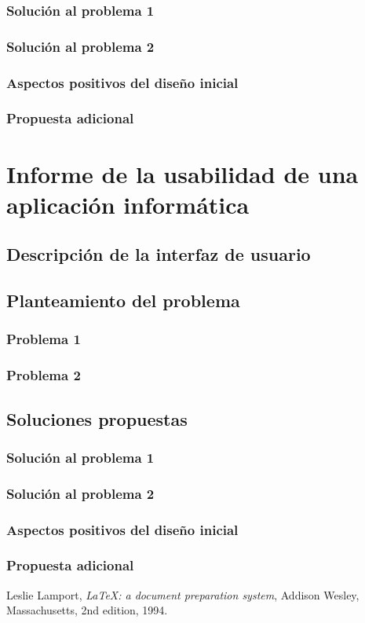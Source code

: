 \documentclass[a4paper,11pt]{article}
\begin{document}
\subsubsection{Solución al problema 1}
\subsubsection{Solución al problema 2}
\subsubsection{Aspectos positivos del diseño inicial}
\subsubsection{Propuesta adicional}






\section{Informe de la usabilidad de una aplicación informática}
\subsection{Descripción de la interfaz de usuario}

\subsection{Planteamiento del problema}
\subsubsection{Problema 1}
\subsubsection{Problema 2}

\subsection{Soluciones propuestas}
\subsubsection{Solución al problema 1}
\subsubsection{Solución al problema 2}
\subsubsection{Aspectos positivos del diseño inicial}
\subsubsection{Propuesta adicional}

\begin{thebibliography}{9}

  Leslie Lamport,
  \textit{\LaTeX: a document preparation system},
  Addison Wesley, Massachusetts,
  2nd edition,
  1994.

\end{thebibliography}
\end{document}
